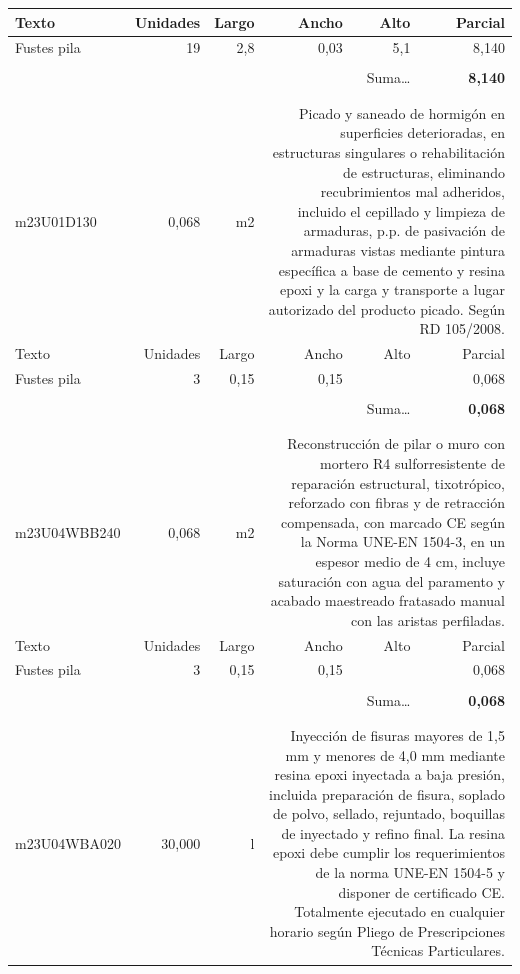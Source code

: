 \documentclass{book}%
\begin{document}
\begin{longtable}{lrrrrr}
Texto&Unidades&Largo&Ancho&Alto&Parcial\\%
\hline%
\multicolumn{1}{p{3.5cm}}{Fustes pila}&19&2,8&0,03&5,1&     8,140\\%
&&&&&\\%
\multicolumn{5}{r}{Suma\ldots}&\textbf{     8,140}\\%
\hline%
&&&&&\\%
&&&&&\\%
m23U01D130&     0,068& m2&\multicolumn{3}{p{6cm}}{\scriptsize Picado y saneado de hormigón en superficies deterioradas, en estructuras singulares o rehabilitación de estructuras, eliminando recubrimientos mal adheridos, incluido el cepillado y limpieza de armaduras, p.p. de pasivación de armaduras vistas mediante pintura específica a base de cemento y resina epoxi y la carga y transporte a lugar autorizado del producto picado. Según RD 105/2008.\normalsize}\\%
Texto&Unidades&Largo&Ancho&Alto&Parcial\\%
\hline%
\multicolumn{1}{p{3.5cm}}{Fustes pila}&3&0,15&0,15&&     0,068\\%
&&&&&\\%
\multicolumn{5}{r}{Suma\ldots}&\textbf{     0,068}\\%
\hline%
&&&&&\\%
&&&&&\\%
m23U04WBB240&     0,068& m2&\multicolumn{3}{p{6cm}}{\scriptsize Reconstrucción de pilar o muro con mortero R4 sulforresistente de reparación estructural, tixotrópico, reforzado con fibras y de retracción compensada, con marcado CE según la Norma UNE-EN 1504-3, en un espesor medio de 4 cm, incluye saturación con agua del paramento y acabado maestreado fratasado manual con las aristas perfiladas.\normalsize}\\%
Texto&Unidades&Largo&Ancho&Alto&Parcial\\%
\hline%
\multicolumn{1}{p{3.5cm}}{Fustes pila}&3&0,15&0,15&&     0,068\\%
&&&&&\\%
\multicolumn{5}{r}{Suma\ldots}&\textbf{     0,068}\\%
\hline%
&&&&&\\%
&&&&&\\%
m23U04WBA020&    30,000& l&\multicolumn{3}{p{6cm}}{\scriptsize Inyección de fisuras mayores de 1,5 mm y menores de 4,0 mm mediante resina epoxi inyectada a baja presión, incluida preparación de fisura, soplado de polvo, sellado, rejuntado, boquillas de inyectado y refino final. La resina epoxi debe cumplir los requerimientos de la norma UNE-EN 1504-5 y disponer de certificado CE. Totalmente ejecutado en cualquier horario según Pliego de Prescripciones Técnicas Particulares.\normalsize}\\%

\end{longtable}
\end{document}
